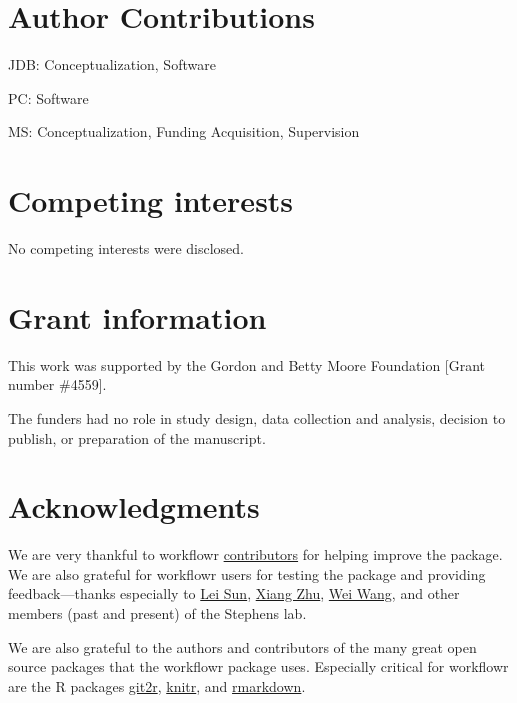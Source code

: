 \documentclass[9pt,a4paper]{extarticle}
\begin{document}
\section*{Author Contributions}

JDB: Conceptualization, Software

PC: Software

MS: Conceptualization, Funding Acquisition, Supervision


\section*{Competing interests}

No competing interests were disclosed.


\section*{Grant information}

This work was supported by the Gordon and Betty Moore Foundation [Grant
number \#4559].

The funders had no role in study design, data collection and analysis,
decision to publish, or preparation of the manuscript.


\section*{Acknowledgments}

We are very thankful to workflowr
\href{https://github.com/jdblischak/workflowr/graphs/contributors}{contributors}
for helping improve the package. We are also grateful for workflowr
users for testing the package and providing feedback---thanks especially
to \href{https://github.com/LSun}{Lei Sun},
\href{https://github.com/xiangzhu}{Xiang Zhu},
\href{https://github.com/NKweiwang}{Wei Wang}, and other members (past
and present) of the Stephens lab.

We are also grateful to the authors and contributors of the many great
open source packages that the workflowr package uses. Especially
critical for workflowr are the R packages
\href{https://cran.r-project.org/web/packages/git2r/index.html}{git2r},
\href{https://github.com/yihui/knitr}{knitr}, and
\href{http://rmarkdown.rstudio.com/}{rmarkdown}.


{\small

}
\end{document}
